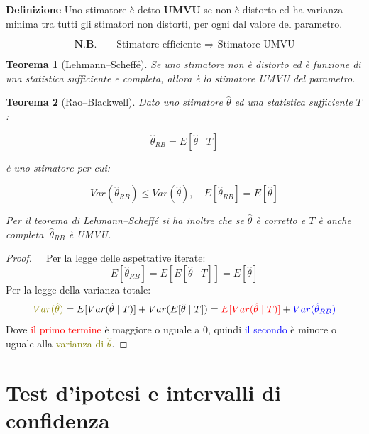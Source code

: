 \documentclass{article}
\newtheorem{theorem}{Teorema}
\newcommand{\df}{\noindent\textbf{Definizione} }
\begin{document}
\df Uno stimatore è detto \textbf{UMVU} se non è distorto ed ha varianza minima tra tutti gli stimatori non distorti, per ogni dal valore del parametro.

\[
\boxed{
\textbf{N.B.}\qquad \text{Stimatore efficiente } \Rightarrow \text{ Stimatore UMVU}
}
\]

\vspace{10pt}

\begin{theorem}[Lehmann–Scheffé]
    Se uno stimatore non è distorto ed è funzione di una statistica sufficiente e completa, allora è lo stimatore UMVU del parametro.
\end{theorem}

\begin{theorem}[Rao–Blackwell]
    Dato uno stimatore $\hat{\theta}$ ed una statistica sufficiente $T$:

    \[
        \hat{\theta}_{RB}=E[\hat{\theta}\mid T]
    \]

    è uno stimatore per cui:

    $$Var(\hat{\theta}_{RB})\leq Var(\hat{\theta}),\quad E[\hat{\theta}_{RB}]=E[\hat{\theta}]$$

    \vspace{5pt}

    Per il teorema di Lehmann–Scheffé si ha inoltre che se $\hat{\theta}$ è corretto e $T$ è anche completa $\ \hat{\theta}_{RB}$ è UMVU.
    
\end{theorem}

\begin{proof}
    $\ $\newline
    $\ $\newline
    Per la legge delle aspettative iterate:
    $$E[\hat{\theta}_{RB}]=E[E[\hat{\theta}\mid T]]=E[\hat{\theta}]$$
    Per la legge della varianza totale:
    $$\textcolor{olive}{Var(\hat{\theta})}=E[Var(\hat{\theta}\mid T)]+Var(E[\hat{\theta}\mid T])=\textcolor{red}{E[Var(\hat{\theta}\mid T)]}+\textcolor{blue}{Var(\hat{\theta}_{RB})}$$
    Dove \textcolor{red}{il primo termine} è maggiore o uguale a 0, quindi \textcolor{blue}{il secondo} è minore o uguale alla \textcolor{olive}{varianza di $\hat{\theta}$}.
\end{proof}

\newpage

\section{Test d'ipotesi e intervalli di confidenza}
\end{document}
